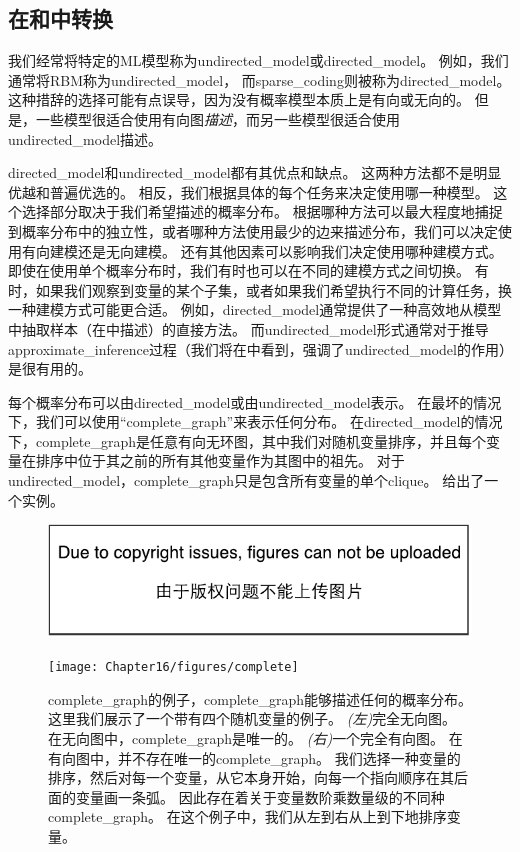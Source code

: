 \subsection{在和中转换}
\label{sec:converting_between_undirected_and_directed_graphs}

我们经常将特定的\gls{ML}模型称为\gls{undirected_model}或\gls{directed_model}。
例如，我们通常将\gls{RBM}称为\gls{undirected_model}， 而\gls{sparse_coding}则被称为\gls{directed_model}。
这种措辞的选择可能有点误导，因为没有概率模型本质上是有向或无向的。
但是，一些模型很适合使用有向图\emph{描述}，而另一些模型很适合使用\gls{undirected_model}描述。

\gls{directed_model}和\gls{undirected_model}都有其优点和缺点。
这两种方法都不是明显优越和普遍优选的。
相反，我们根据具体的每个任务来决定使用哪一种模型。 
这个选择部分取决于我们希望描述的概率分布。
根据哪种方法可以最大程度地捕捉到概率分布中的独立性，或者哪种方法使用最少的边来描述分布，我们可以决定使用有向建模还是无向建模。
还有其他因素可以影响我们决定使用哪种建模方式。 
即使在使用单个概率分布时，我们有时也可以在不同的建模方式之间切换。
有时，如果我们观察到变量的某个子集，或者如果我们希望执行不同的计算任务，换一种建模方式可能更合适。
例如，\gls{directed_model}通常提供了一种高效地从模型中抽取样本（在中描述）的直接方法。
而\gls{undirected_model}形式通常对于推导\gls{approximate_inference}过程（我们将在中看到，强调了\gls{undirected_model}的作用）是很有用的。


每个概率分布可以由\gls{directed_model}或由\gls{undirected_model}表示。
在最坏的情况下，我们可以使用``\gls{complete_graph}''来表示任何分布。
在\gls{directed_model}的情况下，\gls{complete_graph}是任意有向无环图，其中我们对随机变量排序，并且每个变量在排序中位于其之前的所有其他变量作为其图中的祖先。
对于\gls{undirected_model}，\gls{complete_graph}只是包含所有变量的单个\gls{clique}。 
给出了一个实例。

\begin{figure}[!htb]
\ifOpenSource
\centerline{\includegraphics{figure.pdf}}
\else
	\centerline{\texttt{[image: Chapter16/figures/complete]}}	
\fi
\caption{\gls{complete_graph}的例子，\gls{complete_graph}能够描述任何的概率分布。
这里我们展示了一个带有四个随机变量的例子。
\emph{(左)}完全无向图。
在无向图中，\gls{complete_graph}是唯一的。
\emph{(右)}一个完全有向图。
在有向图中，并不存在唯一的\gls{complete_graph}。
我们选择一种变量的排序，然后对每一个变量，从它本身开始，向每一个指向顺序在其后面的变量画一条弧。
因此存在着关于变量数阶乘数量级的不同种\gls{complete_graph}。
在这个例子中，我们从左到右从上到下地排序变量。}
	\label{fig:complete}
\end{figure}


